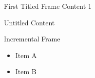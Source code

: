 \documentclass[14pt,t]{beamer-accessibility}
\begin{document}
\begin{frame}{First Titled Frame}
Content 1
\end{frame}
\begin{frame}
Untitled Content
\end{frame}
\begin{frame}{Incremental Frame}
\begin{itemize}
\item<1-> Item A
\item<2-> Item B
\end{itemize}
\end{frame}
\end{document}
